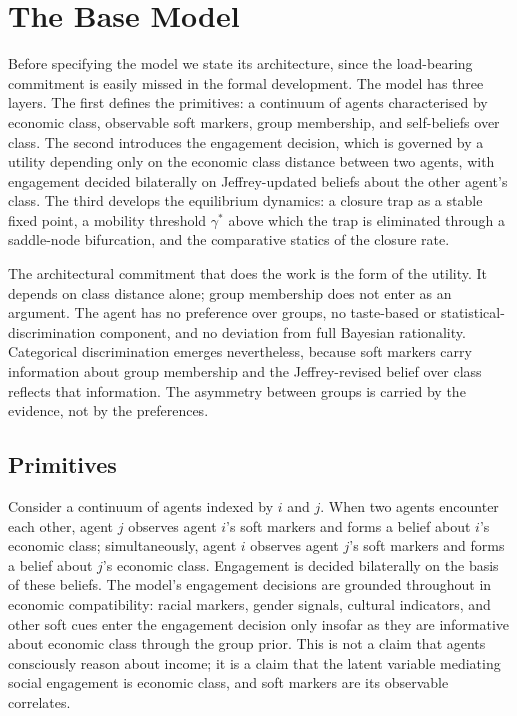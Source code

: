 \documentclass[12pt,a4paper]{article}
\theoremstyle{definition}
\numberwithin{proposition}{subsection}
\begin{document}
\section{The Base Model}
\label{sec:model}

Before specifying the model we state its architecture, since the
load-bearing commitment is easily missed in the formal development.
The model has three layers. The first defines the primitives: a
continuum of agents characterised by economic class, observable soft
markers, group membership, and self-beliefs over class. The second
introduces the engagement decision, which is governed by a utility
depending only on the economic class distance between two agents, with
engagement decided bilaterally on Jeffrey-updated beliefs about the
other agent's class. The third develops the equilibrium dynamics: a
closure trap as a stable fixed point, a mobility threshold
$\gamma^*$ above which the trap is eliminated through a saddle-node
bifurcation, and the comparative statics of the closure rate.

The architectural commitment that does the work is the form of the
utility. It depends on class distance alone; group membership does
not enter as an argument. The agent has no preference over groups,
no taste-based or statistical-discrimination component, and no
deviation from full Bayesian rationality. Categorical discrimination
emerges nevertheless, because soft markers carry information about
group membership and the Jeffrey-revised belief over class reflects
that information. The asymmetry between groups is carried by the
evidence, not by the preferences.

\subsection{Primitives}

Consider a continuum of agents indexed by $i$ and $j$. When two
agents encounter each other, agent $j$ observes agent $i$'s soft
markers and forms a belief about $i$'s economic class; simultaneously,
agent $i$ observes agent $j$'s soft markers and forms a belief about
$j$'s economic class. Engagement is decided bilaterally on the basis
of these beliefs. The model's engagement decisions are grounded
throughout in economic compatibility: racial markers, gender signals,
cultural indicators, and other soft cues enter the engagement decision
only insofar as they are informative about economic class through the
group prior. This is not a claim that agents consciously reason about
income; it is a claim that the latent variable mediating social
engagement is economic class, and soft markers are its observable
correlates.
\end{document}
